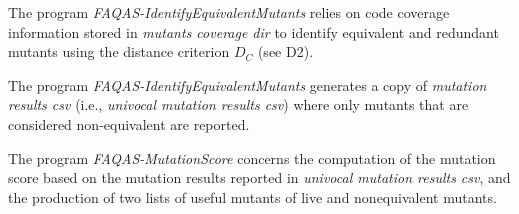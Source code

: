 The program \emph{FAQAS-IdentifyEquivalentMutants} relies on code coverage information stored in \emph{mutants coverage dir} to identify equivalent and redundant mutants using the distance criterion $D_C$ (see D2).

The program \emph{FAQAS-IdentifyEquivalentMutants} generates a copy of \emph{mutation results csv} (i.e., \emph{univocal mutation results csv}) where only mutants that are considered non-equivalent are reported.

The program \emph{FAQAS-MutationScore} concerns the computation of the mutation score based on the mutation results reported in \emph{univocal mutation results csv}, and the production of two lists of useful mutants of live and nonequivalent mutants.


